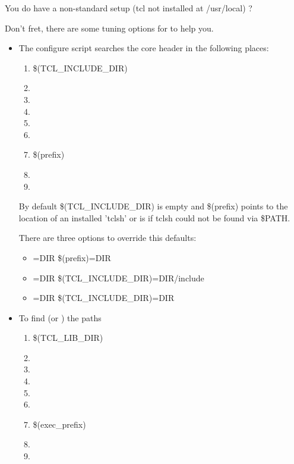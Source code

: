\documentclass {report}
\begin{document}
You do have a non-standard setup (tcl not installed at \file
{/usr/local}) ?

Don't fret, there are some tuning options for  to help
you. 

\begin {itemize}
\item	The configure script searches the core header  in
	the following places:

	\begin {enumerate}
	\item	\$(TCL\_INCLUDE\_DIR)
	\item	{}
	\item	{}
	\item	{}
	\item	{}
	\item	{}
	\item	\$(prefix)
	\item	{}
	\item	{}
	\end {enumerate}

	By default \$(TCL\_INCLUDE\_DIR) is empty and \$(prefix) points
	to the location of an installed 'tclsh' or is  if
	tclsh could not be found via \$PATH.

	There are three options to override this defaults:

	\begin {itemize}
	\item[]	=DIR		   \ra {} \$(prefix)=DIR
	\item[]	=DIR		   \ra {} \$(TCL\_INCLUDE\_DIR)=DIR/include
	\item[]	=DIR  \ra {} \$(TCL\_INCLUDE\_DIR)=DIR
	\end {itemize}


\item	To find  (or ) the paths

	\begin {enumerate}
	\item	\$(TCL\_LIB\_DIR)
	\item	{}
	\item	{}
	\item	{}
	\item	{}
	\item	{}
	\item	\$(exec\_prefix)
	\item	{}
	\item	{}
	\end {enumerate}


\end{itemize}
\end{document}
